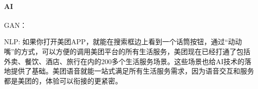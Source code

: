\documentclass[letterpaper,10pt,english]{sphinxmanual}
\begin{document}
\paragraph{AI}
\label{\detokenize{chapter_AI_company/meituan:ai}}

GAN：

NLP:
如果你打开美团APP，就能在搜索框边上看到一个话筒按钮，通过“动动嘴”的方式，可以方便的调用美团平台的所有生活服务，美团现在已经打通了包括外卖、餐饮、酒店、旅行在内的200多个生活服务场景。这些场景也给AI技术的落地提供了基础。美团语音就能一站式满足所有生活服务需求，因为语音交互和服务都是美团的，体验可以衔接的更紧密。%
\begin{footnote}[1034]\sphinxAtStartFootnote
{}
%
\end{footnote}
\end{document}
